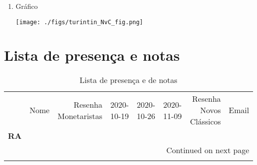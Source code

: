 \documentclass[11pt]{article}
\begin{document}
\begin{enumerate}
\item Gráfico
\label{sec:orgfaaa9d1}
\begin{center}
\texttt{[image: ./figs/turintin\_NvC\_fig.png]}
\end{center}
\end{enumerate}


\section{Lista de presença e notas}
\label{sec:org6706ec0}
\begin{center}\begin{landscape}
\small
\setlength\LTleft{0pt}
\setlength\LTright{0pt}
\begin{longtable}{llrrrrrl}
\caption{Lista de presença e de notas}\label{lista}\\
\toprule
{} &                                   Nome &  Resenha Monetaristas &  2020-10-19 &  2020-10-26 &  2020-11-09 &  Resenha Novos Clássicos &                   Email \\
\textbf{RA    } &                                        &                       &             &             &             &                          &                         \\
\midrule
\endhead
\midrule
\multicolumn{8}{r}{{Continued on next page}} \\
\midrule
\endfoot


\end{longtable}
\end{landscape}
\end{center}
\end{document}
